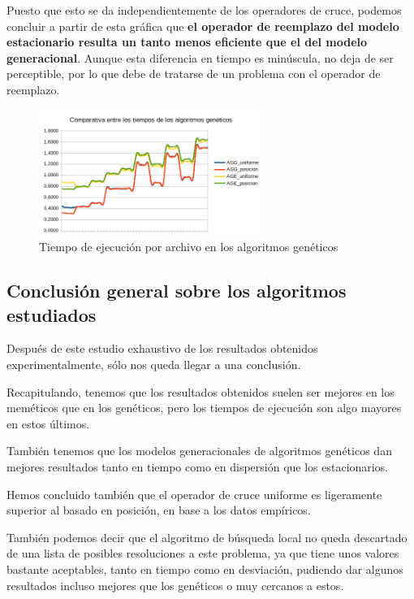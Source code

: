 Puesto que esto se da independientemente de los operadores de cruce, podemos concluir a partir de esta gráfica que \textbf{el operador de reemplazo del modelo estacionario resulta un tanto menos eficiente que el del modelo generacional}. Aunque esta diferencia en tiempo es minúscula, no deja de ser perceptible, por lo que debe de tratarse de un problema con el operador de reemplazo.

\begin{figure}[H]
    \centering
	\includegraphics[width=0.65\textwidth]{data/tiempo_geneticos.png}
	\caption{Tiempo de ejecución por archivo en los algoritmos genéticos}
	\label{fig:tgeneticos}
\end{figure}

\newpage

\subsection{Conclusión general sobre los algoritmos estudiados}

Después de este estudio exhaustivo de los resultados obtenidos experimentalmente, sólo nos queda llegar a una conclusión.

Recapitulando, tenemos que los resultados obtenidos suelen ser mejores en los meméticos que en los genéticos, pero los tiempos de ejecución son algo mayores en estos últimos.

También tenemos que los modelos generacionales de algoritmos genéticos dan mejores resultados tanto en tiempo como en dispersión que los estacionarios.

Hemos concluido también que el operador de cruce uniforme es ligeramente superior al basado en posición, en base a los datos empíricos.

También podemos decir que el algoritmo de búsqueda local no queda descartado de una lista de posibles resoluciones a este problema, ya que tiene unos valores bastante aceptables, tanto en tiempo como en desviación, pudiendo dar algunos resultados incluso mejores que los genéticos o muy cercanos a estos.


